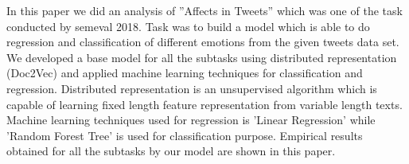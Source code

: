 In this paper we did an analysis of ''Affects in Tweets'' which was one of the task conducted by semeval 2018. Task was to build a model which is able to do regression and classification of different emotions from the given tweets data set. We developed a base model for all the subtasks using distributed representation (Doc2Vec) and applied machine learning techniques for classification and regression. Distributed representation is an unsupervised algorithm which is capable of learning fixed length feature representation from variable length texts. Machine learning techniques used for regression is 'Linear Regression' while 'Random Forest Tree' is used for classification purpose. Empirical results obtained for all the subtasks by our model are shown in this paper.
